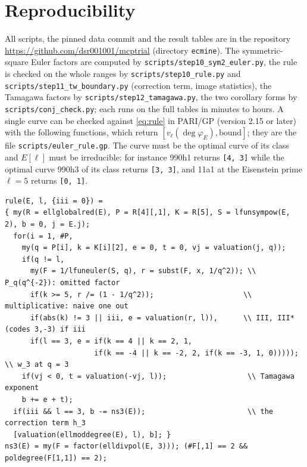 \documentclass[11pt]{amsart}
\theoremstyle{definition}
\newcommand{\degphi}{\deg\varphi_E}
\begin{document}
\section{Reproducibility}
All scripts, the pinned data commit and the result tables are in the repository \url{https://github.com/dsr001001/mcptrial} (directory \texttt{ecmine}). The symmetric-square Euler factors are computed by \texttt{scripts/step10\_sym2\_euler.py}, the rule is checked on the whole ranges by \texttt{scripts/step10\_rule.py} and \texttt{scripts/step11\_tw\_boundary.py} (correction term, image statistics), the Tamagawa factors by \texttt{scripts/step12\_tamagawa.py}, the two corollary forms by \texttt{scripts/conj\_check.py}; each runs on the full tables in minutes to hours. A single curve can be checked against \eqref{eq:rule} in PARI/GP (version 2.15 or later) with the following functions, which return $[v_\ell(\degphi),\text{bound}]$; they are the file \texttt{scripts/euler\_rule.gp}. The curve must be the optimal curve of its class and $E[\ell]$ must be irreducible: for instance 990h1 returns \texttt{[4, 3]} while the optimal curve 990h3 of its class returns \texttt{[3, 3]}, and 11a1 at the Eisenstein prime $\ell=5$ returns \texttt{[0, 1]}.
{\footnotesize\begin{verbatim}
rule(E, l, {iii = 0}) =
{ my(R = ellglobalred(E), P = R[4][,1], K = R[5], S = lfunsympow(E, 2), b = 0, j = E.j);
  for(i = 1, #P,
    my(q = P[i], k = K[i][2], e = 0, t = 0, vj = valuation(j, q));
    if(q != l,
      my(F = 1/lfuneuler(S, q), r = subst(F, x, 1/q^2)); \\ P_q(q^{-2}): omitted factor
      if(k >= 5, r /= (1 - 1/q^2));                     \\ multiplicative: naive one out
      if(abs(k) != 3 || iii, e = valuation(r, l)),      \\ III, III* (codes 3,-3) if iii
      if(l == 3, e = if(k == 4 || k == 2, 1,
                     if(k == -4 || k == -2, 2, if(k == -3, 1, 0)))));   \\ w_3 at q = 3
    if(vj < 0, t = valuation(-vj, l));                   \\ Tamagawa exponent
    b += e + t);
  if(iii && l == 3, b -= ns3(E));                        \\ the correction term h_3
  [valuation(ellmoddegree(E), l), b]; }
ns3(E) = my(F = factor(elldivpol(E, 3))); (#F[,1] == 2 && poldegree(F[1,1]) == 2);
\end{verbatim}}
\end{document}
